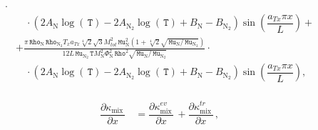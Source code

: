 \documentclass[10pt]{article}
\newcommand{\diff}[2] {\dfrac{\partial #1 }{\partial #2}}
\newcommand{\Rho}{\,\mathtt{Rho}}
\newcommand{\T}{\,\mathtt{T}}
\newcommand{\N}{\text{N}}
\newcommand{\Mu}{\, \mathtt{Mu}}
\newcommand{\mix}{\text{mix}\,}
\newcommand{\DKappaDx}{\diff{\kappa_{\mix}}{x}\,}
\newcommand{\DKappaevDx}{\diff{\kappa^{ev}_{\mix}}{x}\,}
\newcommand{\DKappatrDx}{\diff{\kappa^{tr}_{\mix}}{x}\,}
\begin{document}
\begin{equation}
\begin{split}
\cdot\\
 &\quad \cdot ( 2 A_{\N} \log(\T) - 2 A_{\N_2} \log(\T) +B_{\N} - B_{\N_2} ) \sin\left(\dfrac{a_{Tx} \pi x}{L}\right) +\\ 
  &+ \frac{\pi \Rho_{\N} \Rho_{\N_2} T_{x} a_{Tx} \sqrt[4]{2} \sqrt{3} M_{tot}^{2} \Mu_{\N}^{2} \left(1 + \sqrt[4]{2} \sqrt{
\Mu_{\N} / \Mu_{\N_2} }\right) }{12 L \Mu_{\N_2} \T M_{\N}^{2} \Phi_{\N}^{2} \Rho^{2} \sqrt{\Mu_{\N} / \Mu_{\N_2} } } \cdot\\
  &\quad \cdot ( 2 A_{\N} \log(\T) - 2 A_{\N_2} \log(\T) +B_{\N} - B_{\N_2} ) \sin\left(\dfrac{a_{Tx} \pi x}{L}\right),\\
%
\end{split}
\end{equation}


\begin{equation}
\begin{split}\label{eq:DKappaDx}
 \DKappaDx &= \DKappaevDx + \DKappatrDx,\\
%
\end{split}
\end{equation}
\end{document}
